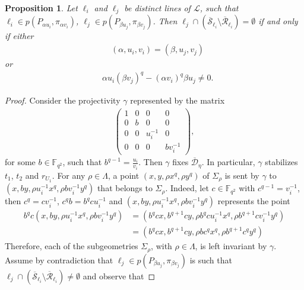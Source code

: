 \documentclass[11pt]{article}
\newtheorem{prop}[theorem]{Proposition}
\theoremstyle{definition}
\numberwithin{equation}{section}
\def\cL{\mathcal L}
\def\cD{\mathcal D}
\def\cR{\mathcal R}
\def\cS{\mathcal S}
\def\F{{\mathbb F}}
\begin{document}
\begin{prop}\label{mainp2}
Let $\ell_{i}$ and $\ell_j$ be distinct lines of $\cL$, such that $\ell_{i} \in p\left( P_{\alpha u_i}, \pi_{\alpha v_i} \right)$, $\ell_j \in p\left( P_{\beta u_{j}}, \pi_{\beta v_{j}} \right)$. Then $\ell_j \cap \left( \overline{\cS}_{\ell_i} \setminus \overline{\cR}_{\ell_i} \right) = \emptyset$ if and only if either 
\begin{align*}
  & (\alpha, u_i, v_i) = (\beta, u_j, v_j)  
\end{align*}
or
\begin{align*}
& \alpha u_i \left(\beta v_j\right)^q - \left(\alpha v_i\right)^q \beta u_j \ne 0. 
\end{align*}
\end{prop}
\begin{proof}
Consider the projectivity $\gamma$ represented by the matrix
\begin{align*}
\begin{pmatrix}
1 & 0 & 0 & 0 \\
0 & b & 0 & 0 \\
0 & 0 & u_i^{-1} & 0 \\
0 & 0 & 0 & b v_i^{-1}
\end{pmatrix}, 
\end{align*}
for some $b \in \F_{q^2}$, such that $b^{q-1} = \frac{u_i}{v_i}$. Then $\gamma$ fixes $\overline{\cD}_{\eta}$. In particular, $\gamma$ stabilizes $t_1$, $t_2$ and $r_{U_1}$. For any $\rho \in \Lambda$, a point $\left(x,y,\rho x^q, \rho y^q\right)$ of $\Sigma_{\rho}$ is sent by $\gamma$ to $\left(x, by, \rho u_i^{-1} x^q, \rho b v_i^{-1} y^q\right)$ that belongs to $\Sigma_{\rho}$. Indeed, let $c \in \F_{q^2}$ with $c^{q-1} = v_i^{-1}$, then $c^q = c v_i^{-1}$, $c^q b = b^q c u_i^{-1}$ and $\left(x, by, \rho u_i^{-1} x^q, \rho b v_i^{-1} y^q\right)$ represents the point
\begin{align*}
b^q c \left(x, by, \rho u_i^{-1} x^q, \rho b v_i^{-1} y^q\right) & = \left( b^qc x, b^{q+1} c y, \rho b^q c u_i^{-1} x^q, \rho b^{q+1} c v_i^{-1} y^q \right) \\
& = \left( b^q c x, b^{q+1} c y, \rho b c^q x^q, \rho b^{q+1} c^q y^q \right)
\end{align*}
Therefore, each of the subgeometries $\Sigma_{\rho}$, with $\rho \in \Lambda$, is left invariant by $\gamma$. Assume by contradiction that $\ell_j \in p\left( P_{\beta u_j}, \pi_{\beta v_j} \right)$ is such that $\ell_j \cap \left( \overline{\cS}_{\ell_{i}} \setminus \overline{\cR}_{\ell_{i}} \right) \ne \emptyset$ and observe that 

\end{proof}
\end{document}
